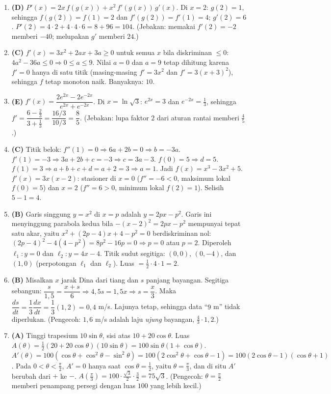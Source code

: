 \documentclass[a4paper,11pt]{article}
\newcommand{\dd}[2]{\dfrac{d#1}{d#2}}
\newcounter{no}
\begin{document}
\begin{enumerate}[leftmargin=2em,itemsep=2pt,topsep=2pt]
\item[\textbf{9.}] \textbf{(D)} $P'(x)=2x\,f(g(x))+x^2\,f'(g(x))\,g'(x)$. Di $x=2$: $g(2)=1$, sehingga $f(g(2))=f(1)=2$ dan $f'(g(2))=f'(1)=4$; $g'(2)=6$. $P'(2)=4\cdot2+4\cdot4\cdot6=8+96=104$. (Jebakan: memakai $f'(2)=-2$ memberi $-40$; melupakan $g'$ memberi $24$.)
\item[\textbf{10.}] \textbf{(C)} $f'(x)=3x^2+2ax+3a\ge0$ untuk semua $x$ bila diskriminan $\le0$: $4a^2-36a\le0\Rightarrow0\le a\le9$. Nilai $a=0$ dan $a=9$ tetap dihitung karena $f'=0$ hanya di satu titik (masing-masing $f'=3x^2$ dan $f'=3(x+3)^2$), sehingga $f$ tetap monoton naik. Banyaknya: $10$.
\item[\textbf{11.}] \textbf{(E)} $f'(x)=\dfrac{2e^{2x}-2e^{-2x}}{e^{2x}+e^{-2x}}$. Di $x=\ln\sqrt3$: $e^{2x}=3$ dan $e^{-2x}=\frac13$, sehingga $f'=\dfrac{6-\frac23}{3+\frac13}=\dfrac{16/3}{10/3}=\dfrac85$. (Jebakan: lupa faktor $2$ dari aturan rantai memberi $\frac45$.)
\item[\textbf{12.}] \textbf{(C)} Titik belok: $f''(1)=0\Rightarrow6a+2b=0\Rightarrow b=-3a$. $f'(1)=-3\Rightarrow3a+2b+c=-3\Rightarrow c=3a-3$. $f(0)=5\Rightarrow d=5$. $f(1)=3\Rightarrow a+b+c+d=a+2=3\Rightarrow a=1$. Jadi $f(x)=x^3-3x^2+5$. $f'(x)=3x(x-2)$: stasioner di $x=0$ ($f''=-6<0$, maksimum lokal $f(0)=5$) dan $x=2$ ($f''=6>0$, minimum lokal $f(2)=1$). Selisih $5-1=4$.
\item[\textbf{13.}] \textbf{(B)} Garis singgung $y=x^2$ di $x=p$ adalah $y=2px-p^2$. Garis ini menyinggung parabola kedua bila $-(x-2)^2=2px-p^2$ mempunyai tepat satu akar, yaitu $x^2+(2p-4)x+4-p^2=0$ berdiskriminan nol: $(2p-4)^2-4(4-p^2)=8p^2-16p=0\Rightarrow p=0$ atau $p=2$. Diperoleh $\ell_1:y=0$ dan $\ell_2:y=4x-4$. Titik sudut segitiga: $(0,0)$, $(0,-4)$, dan $(1,0)$ (perpotongan $\ell_1$ dan $\ell_2$). Luas $=\frac12\cdot4\cdot1=2$.
\item[\textbf{14.}] \textbf{(B)} Misalkan $x$ jarak Dina dari tiang dan $s$ panjang bayangan. Segitiga sebangun: $\dfrac{s}{1{,}5}=\dfrac{x+s}{6}\Rightarrow4{,}5s=1{,}5x\Rightarrow s=\dfrac x3$. Maka $\dd st=\dfrac13\dd xt=\dfrac13(1{,}2)=0{,}4$ m/s. Lajunya tetap, sehingga data ``$9$ m'' tidak diperlukan. (Pengecoh: $1{,}6$ m/s adalah laju \emph{ujung} bayangan, $\frac43\cdot1{,}2$.)
\item[\textbf{15.}] \textbf{(A)} Tinggi trapesium $10\sin\theta$, sisi atas $10+20\cos\theta$. Luas $A(\theta)=\frac12(20+20\cos\theta)(10\sin\theta)=100\sin\theta(1+\cos\theta)$. $A'(\theta)=100(\cos\theta+\cos^2\theta-\sin^2\theta)=100(2\cos^2\theta+\cos\theta-1)=100(2\cos\theta-1)(\cos\theta+1)$. Pada $0<\theta<\frac\pi2$, $A'=0$ hanya saat $\cos\theta=\frac12$, yaitu $\theta=\frac\pi3$, dan di situ $A'$ berubah dari $+$ ke $-$. $A\!\left(\frac\pi3\right)=100\cdot\frac{\sqrt3}2\cdot\frac32=75\sqrt3$. (Pengecoh: $\theta=\frac\pi2$ memberi penampang persegi dengan luas $100$ yang lebih kecil.)

\end{enumerate}
\end{document}
